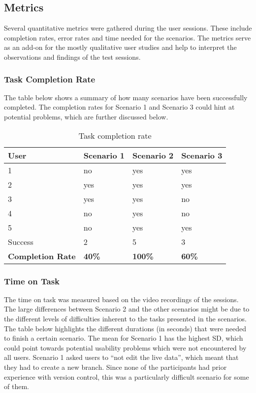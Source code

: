 \subsection{Metrics}
Several quantitative metrics were gathered during the user sessions. These include completion rates, error rates and time needed for the scenarios. The metrics serve as an add-on for the mostly qualitative user studies and help to interpret the observations and findings of the test sessions.

\subsubsection{Task Completion Rate}
The table below shows a summary of how many scenarios have been successfully completed. The completion rates for Scenario 1 and Scenario 3 could hint at potential problems, which are further discussed below.

\begin{table}[h!]
\begin{tabular}{|l|l|l|l|}
\hline
\rowcolor[HTML]{EFEFEF}
{\bf User}                     & {\bf Scenario 1} & {\bf Scenario 2} & {\bf Scenario 3} \\ \hline
1                              & no           & yes          & yes          \\ \hline
2                              & yes          & yes          & yes          \\ \hline
3                              & yes          & yes          & no           \\ \hline
4                              & no           & yes          & no      \\ \hline
5                              & no      & yes          & yes          \\ \hline
\rowcolor[HTML]{EFEFEF}
Success & 2 & 5 & 3 \\ \hline
\rowcolor[HTML]{EFEFEF}
{\bf Completion Rate} & {\bf 40\%}   & {\bf 100\%}  & {\bf 60\%}   \\ \hline
\end{tabular}
\centering
\caption{Task completion rate}
\label{table:task-completion-rate}
\end{table}

\subsubsection{Time on Task}
The time on task was measured based on the video recordings of the sessions. The large differences between Scenario 2 and the other scenarios might be due to the different levels of difficulties inherent to the tasks presented in the scenarios. The table below highlights the different durations (in seconds) that were needed to finish a certain scenario. The mean for Scenario 1 has the highest \ac{SD}, which could point towards potential usability problems which were not encountered by all users. Scenario 1 asked users to “not edit the live data”, which meant that they had to create a new branch. Since none of the participants had prior experience with version control, this was a particularly difficult scenario for some of them.

